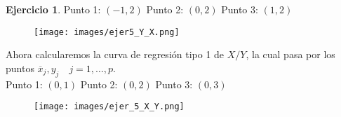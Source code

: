 \documentclass[a4paper, 12pt]{article}
\theoremstyle{definition}
\newtheorem{ej}{Ejercicio}
\begin{document}
\begin{ej}
Punto 1: \((-1, 2)\) \hspace{1cm} Punto 2: \((0, 2)\) \hspace{1cm} Punto 3: \((1, 2)\)

\begin{figure}[!h]
	\centering
	\texttt{[image: images/ejer5\_Y\_X.png]}
\end{figure}

\par 

Ahora calcularemos la curva de regresión tipo 1 de \(X/Y\), la cual pasa por los puntos \(\overline{x}_j, y_j \quad j = 1, \dotsc, p\). \\

Punto 1: \((0, 1)\) \hspace{1cm} Punto 2: \((0, 2)\) \hspace{1cm} Punto 3: \((0, 3)\)

\begin{figure}[!h]
	\centering
	\texttt{[image: images/ejer\_5\_X\_Y.png]}
\end{figure}

\end{ej}
\end{document}
